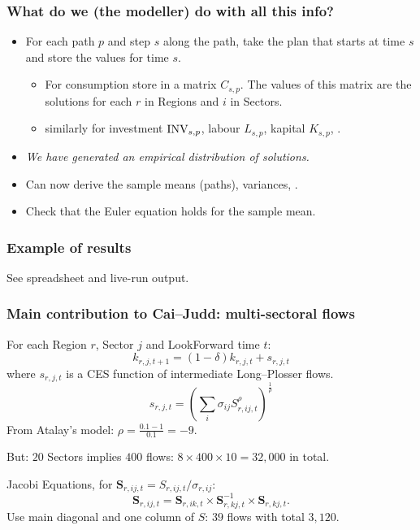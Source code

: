 \documentclass[handout,english]{beamer}
\begin{document}
\begin{frame}
  \frametitle{What do we (the modeller) do with all this info?}
  \begin{itemize}
    
    \item For each path $p$ and step $s$ along the path, take the plan that
      starts at time $s$ and store the values for time $s$.
    \begin{itemize}
      \item For consumption store in a matrix $C_{s, p}$. The values of this
        matrix are the solutions for each $r$ in Regions and $i$ in Sectors.

      \item similarly for investment $\textup{INV}_{s, p}$, labour $L_{s, p}$,
        kapital $K_{s, p}$, \etc.
    \end{itemize}
    \item \emph{We have generated an empirical distribution of solutions.}

    \item Can now derive the sample means (paths), variances, \etc.

    \item Check that the Euler equation holds for the sample mean.

  \end{itemize}
\end{frame}
\begin{frame}
  \frametitle{Example of results}
  
  See spreadsheet and live-run output.
\end{frame}
\begin{frame}\thispagestyle{empty}
  \frametitle{Main contribution to Cai--Judd: multi-sectoral flows}
  For each Region $r$, Sector $j$ and LookForward time $t$:
  \[
    k_{r, j, t + 1} = (1 - \delta) k_{r, j, t} + s_{r, j, t}
  \]
  where $s_{r, j, t}$ is a CES function of intermediate Long--Plosser flows.
  \[
    s_{r, j, t} = \left(\sum_{i} \sigma_{i j} S_{r, i j, t} ^ {\rho} \right)
      ^ {\frac{1}{\rho}}
  \]
  From Atalay's model: $\rho = \frac{0.1 - 1}{0.1} = -9$.

  But: $20$ Sectors implies $400$ flows: $8 \times 400 \times 10 = 32,000$ in 
  total.

  Jacobi Equations, for $\mathbf{S}_{r, ij, t} = S_{r, ij, t} / \sigma_{r, ij}$:
    \[
      \mathbf{S}_{r, ij, t} = \mathbf{S}_{r, ik, t} \times
      \mathbf{S}_{r, kj, t}^{-1} \times \mathbf{S}_{r, kj, t} .
    \]
  Use main diagonal and one column of $S$: $39$ flows with total $3,120$.
\end{frame}
\end{document}
